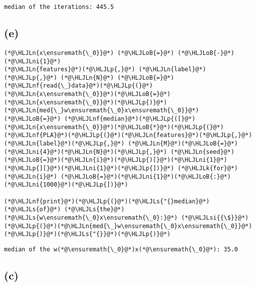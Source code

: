 \documentclass[12pt,a4paper]{article}
\newcommand{\HLJLk}[1]{\textcolor[RGB]{148,91,176}{\textbf{#1}}}
\newcommand{\HLJLn}[1]{#1}
\newcommand{\HLJLnf}[1]{\textcolor[RGB]{66,102,213}{#1}}
\newcommand{\HLJLs}[1]{\textcolor[RGB]{201,61,57}{#1}}
\newcommand{\HLJLsi}[1]{#1}
\newcommand{\HLJLni}[1]{\textcolor[RGB]{59,151,46}{#1}}
\newcommand{\HLJLoB}[1]{\textcolor[RGB]{102,102,102}{\textbf{#1}}}
\newcommand{\HLJLp}[1]{#1}
\begin{document}
\begin{lstlisting}
median of the iterations: 445.5
\end{lstlisting}


\subsection{(e)}

\begin{lstlisting}
(*@\HLJLn{x\ensuremath{\_0}}@*) (*@\HLJLoB{=}@*) (*@\HLJLoB{-}@*)(*@\HLJLni{1}@*)
(*@\HLJLn{features}@*)(*@\HLJLp{,}@*) (*@\HLJLn{label}@*)(*@\HLJLp{,}@*) (*@\HLJLn{N}@*) (*@\HLJLoB{=}@*) (*@\HLJLnf{read{\_}data}@*)(*@\HLJLp{(}@*)(*@\HLJLn{x\ensuremath{\_0}}@*)(*@\HLJLoB{=}@*)(*@\HLJLn{x\ensuremath{\_0}}@*)(*@\HLJLp{)}@*)
(*@\HLJLn{med{\_}w\ensuremath{\_0}x\ensuremath{\_0}}@*) (*@\HLJLoB{=}@*) (*@\HLJLnf{median}@*)(*@\HLJLp{([}@*)(*@\HLJLn{x\ensuremath{\_0}}@*)(*@\HLJLoB{*}@*)(*@\HLJLp{(}@*)(*@\HLJLnf{PLA}@*)(*@\HLJLp{(}@*)(*@\HLJLn{features}@*)(*@\HLJLp{,}@*) (*@\HLJLn{label}@*)(*@\HLJLp{,}@*) (*@\HLJLn{M}@*)(*@\HLJLoB{=}@*)(*@\HLJLni{4}@*)(*@\HLJLn{N}@*)(*@\HLJLp{,}@*) (*@\HLJLn{seed}@*)(*@\HLJLoB{=}@*)(*@\HLJLn{i}@*)(*@\HLJLp{)[}@*)(*@\HLJLni{1}@*)(*@\HLJLp{][}@*)(*@\HLJLni{1}@*)(*@\HLJLp{])}@*) (*@\HLJLk{for}@*) (*@\HLJLn{i}@*) (*@\HLJLoB{=}@*)(*@\HLJLni{1}@*)(*@\HLJLoB{:}@*)(*@\HLJLni{1000}@*)(*@\HLJLp{])}@*)

(*@\HLJLnf{print}@*)(*@\HLJLp{(}@*)(*@\HLJLs{"{}median}@*) (*@\HLJLs{of}@*) (*@\HLJLs{the}@*) (*@\HLJLs{w\ensuremath{\_0}x\ensuremath{\_0}:}@*) (*@\HLJLsi{{\$}}@*)(*@\HLJLp{(}@*)(*@\HLJLn{med{\_}w\ensuremath{\_0}x\ensuremath{\_0}}@*)(*@\HLJLp{)}@*)(*@\HLJLs{"{}}@*)(*@\HLJLp{)}@*)
\end{lstlisting}

\begin{lstlisting}
median of the w(*@\ensuremath{\_0}@*)x(*@\ensuremath{\_0}@*): 35.0
\end{lstlisting}


\subsection{(c)}
\end{document}
